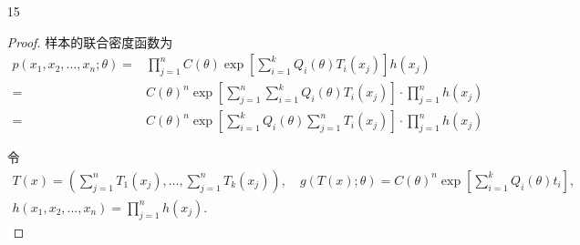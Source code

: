 \documentclass[normal,founder,mtpro2,cn]{elegantnote}
\begin{document}
\begin{enumerate}
\begin{proof}
            由因子分解定理有，$\left(T_{1},T_{2}\right)=\left(\prod_{i=1}^{n}x_{i},\prod_{i=1}^{n}\left(1-x_{i}\right)\right)$ 为 $\left(a,b\right)$ 的充分统计量。
        \end{proof}
    \item[15]
        \begin{proof}
            样本的联合密度函数为
            \begin{equation*}
                \begin{aligned}
                    p\left(x_{1},x_{2},\ldots,x_{n};\theta\right)= & \prod_{j=1}^{n}C(\theta)\exp\left[\sum_{i=1}^{k}Q_{i}(\theta)T_{i}\left(x_{j}\right)\right]h\left(x_{j}\right)                         \\
                    =                                              & C(\theta)^{n}\exp\left[\sum_{j=1}^{n} \sum_{i=1}^{k}Q_{i}(\theta)T_{i}\left(x_{j}\right)\right]\cdot\prod_{j=1}^{n}h\left(x_{j}\right) \\
                    =                                              & C(\theta)^{n}\exp\left[\sum_{i=1}^{k} Q_{i}(\theta)\sum_{j=1}^{n}T_{i}\left(x_{j}\right)\right]\cdot\prod_{j=1}^{n}h\left(x_{j}\right)
                \end{aligned}
            \end{equation*}

            令
            \begin{gather*}
                T(x)=\left(\sum_{j=1}^{n}T_{1}\left(x_{j}\right),\ldots,\sum_{j=1}^{n}T_{k}\left(x_{j}\right)\right),\quad g(T(x);\theta)=C(\theta)^{n}\exp\left[\sum_{i=1}^{k}Q_{i}(\theta)t_{i}\right], \\
                h\left(x_{1},x_{2},\ldots,x_{n}\right)=\prod_{j=1}^{n}h\left(x_{j}\right).
            \end{gather*}


\end{proof}
\end{enumerate}
\end{document}

